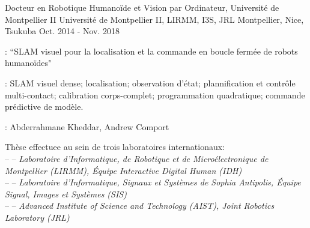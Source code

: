 

\begin{cventries}

  \cventry
    {Docteur en Robotique Humanoïde et Vision par Ordinateur, Université de Montpellier II} %
    {Université de Montpellier II, LIRMM, I3S, JRL} %
    {Montpellier, Nice, Tsukuba} %
    {Oct. 2014 - Nov. 2018} %
    {
      \begin{cvitems} %
        \item {} : ``SLAM visuel pour la localisation et la commande en boucle fermée de robots humanoïdes"
        \item {}: SLAM visuel dense; localisation; observation d'état; plannification et contrôle multi-contact; calibration corps-complet; programmation quadratique; commande prédictive de modèle.
        \item {}: Abderrahmane Kheddar, Andrew Comport 
        \item Thèse effectuee au sein de trois laboratoires internationaux:\\
        --  -- \emph{Laboratoire d'Informatique, de Robotique et de Microélectronique de Montpellier (LIRMM), Équipe Interactive Digital Human (IDH)}\\
          --  -- \emph{Laboratoire d'Informatique, Signaux et Systèmes de Sophia Antipolis, Équipe Signal, Images et Systèmes (SIS)}\\
          --  -- \emph{Advanced Institute of Science and Technology (AIST), Joint Robotics Laboratory (JRL)}
      \end{cvitems}
    }


\end{cventries}
